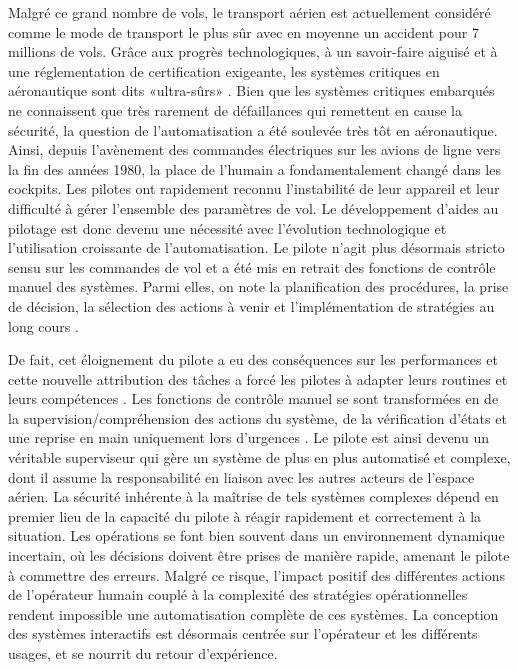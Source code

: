 Malgré ce grand nombre de vols, le transport aérien est actuellement considéré comme le mode de transport le plus sûr avec en moyenne un accident pour 7 millions de vols. 
Grâce aux progrès technologiques, à un savoir-faire aiguisé et à une réglementation de certification exigeante, les systèmes critiques en aéronautique sont dits «ultra-sûrs» \citep{amalberti1998dysfonctionnements}. 
Bien que les systèmes critiques embarqués ne connaissent que très rarement de défaillances qui remettent en cause la sécurité, la question de l’automatisation a été soulevée très tôt en aéronautique. 
Ainsi, depuis l'avènement des commandes électriques sur les avions de ligne vers la fin des années 1980, la place de l'humain a fondamentalement changé dans les cockpits. 
Les pilotes ont rapidement reconnu l’instabilité de leur appareil et leur difficulté à gérer l’ensemble des paramètres de vol. 
Le développement d’aides au pilotage est donc devenu une nécessité avec l'évolution technologique et l'utilisation croissante de l'automatisation. 
Le pilote n'agit plus désormais stricto sensu sur les commandes de vol et a été mis en retrait des fonctions de contrôle manuel des systèmes. 
Parmi elles, on note la planification des procédures, la prise de décision, la sélection des actions à venir et l’implémentation de stratégies au long cours \citep{moray1986monitoring, bainbridge1983ironies}. 

De fait, cet éloignement du pilote a eu des conséquences sur les performances et cette nouvelle attribution des tâches a forcé les pilotes à adapter leurs routines et leurs compétences \citep{somon2018correlats}. 
Les fonctions de contrôle manuel se sont transformées en de la supervision/compréhension des actions du système, de la vérification d’états et une reprise en main uniquement lors d'urgences \citep{moray1986monitoring, sheridan1978human}. 
Le pilote est ainsi devenu un véritable superviseur qui gère un système de plus en plus automatisé et complexe, dont il assume la responsabilité en liaison avec les autres acteurs de l'espace aérien. 
La sécurité inhérente à la maîtrise de tels systèmes complexes dépend en premier lieu de la capacité du pilote à réagir rapidement et correctement à la situation. 
Les opérations se font bien souvent dans un environnement dynamique incertain, où les décisions doivent être prises de manière rapide, amenant le pilote à commettre des erreurs. 
Malgré ce risque, l'impact positif des différentes actions de l’opérateur humain couplé à la complexité des stratégies opérationnelles rendent impossible une automatisation complète de ces systèmes. 
La conception des systèmes interactifs est désormais centrée sur l'opérateur et les différents usages, et se nourrit du retour d'expérience. 

